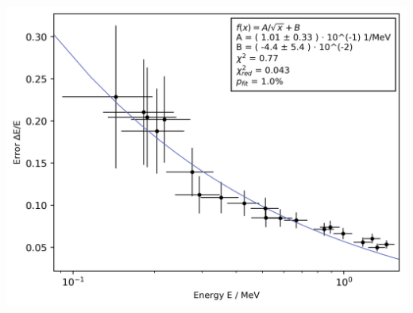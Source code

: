     \begin{center}
        \captionsetup{type=figure}
        \begin{adjustbox}{max width=\linewidth, keepaspectratio}
            \includegraphics[]{png/energy_resolution}
        \end{adjustbox}
        \label{fig:EnergyResolution}
    \end{center}
\endminipage
%
